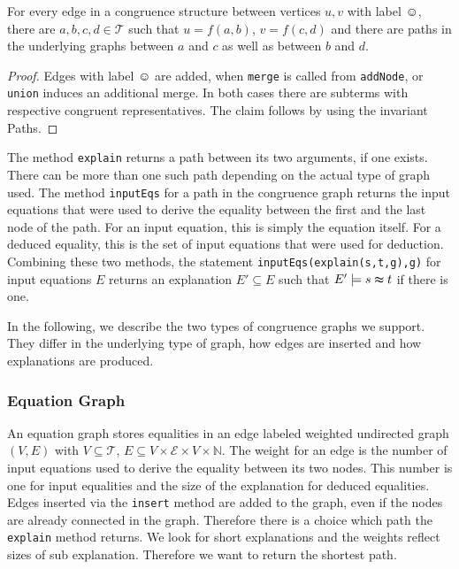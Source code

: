 \begin{invariant}

For every edge in a congruence structure between vertices $u,v$ with label $\smiley$, 
there are $a,b,c,d \in \mathcal{T}$ such that $u = f(a,b)$, $v = f(c,d)$ and
there are paths in the underlying graphs between $a$ and $c$ as well as between $b$ and $d$.

\end{invariant}

\begin{proof}

Edges with label $\smiley$ are added, when \texttt{merge} is called from \texttt{addNode}, or \texttt{union} induces an additional merge.
In both cases there are subterms with respective congruent representatives.
The claim follows by using the invariant Paths.

\end{proof}

The method \texttt{explain} returns a path between its two arguments, if one exists.
There can be more than one such path depending on the actual type of graph used.
The method \texttt{inputEqs} for a path in the congruence graph returns the input equations that were used to derive the equality between the first and the last node of the path.
For an input equation, this is simply the equation itself.
For a deduced equality, this is the set of input equations that were used for deduction.
Combining these two methods, the statement \texttt{inputEqs(explain(s,t,g),g)} for input equations $E$ returns an explanation $E' \subseteq E$ such that $E' \models s \thickapprox t$ if there is one.



In the following, we describe the two types of congruence graphs we support.
They differ in the underlying type of graph, how edges are inserted and how explanations are produced.

\subsubsection*{Equation Graph}

An equation graph stores equalities in an edge labeled weighted undirected graph $(V,E)$ with 
$V \subseteq \mathcal{T}$, $E \subseteq V \times \mathcal{E} \times V \times \mathbb{N}$.
The weight for an edge is the number of input equations used to derive the equality between its two nodes.
This number is one for input equalities and the size of the explanation for deduced equalities.
Edges inserted via the \texttt{insert} method are added to the graph, even if the nodes are already connected in the graph.
Therefore there is a choice which path the \texttt{explain} method returns.
We look for short explanations and the weights reflect sizes of sub explanation.
Therefore we want to return the shortest path.

